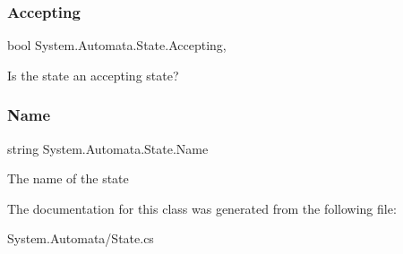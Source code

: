 \subsubsection{\texorpdfstring{Accepting}{Accepting}}
{\footnotesize\ttfamily bool System.\+Automata.\+State.\+Accepting\hspace{0.3cm}{\ttfamily [get]}, {\ttfamily [set]}}



Is the state an accepting state? 

\mbox{\label{class_system_1_1_automata_1_1_state_aba020a3d9150baf1bfd6dd27c93cf297}} 
\subsubsection{\texorpdfstring{Name}{Name}}
{\footnotesize\ttfamily string System.\+Automata.\+State.\+Name\hspace{0.3cm}{\ttfamily [get]}}



The name of the state 



The documentation for this class was generated from the following file\+:\begin{DoxyCompactItemize}
\item 
System.\+Automata/State.\+cs\end{DoxyCompactItemize}
